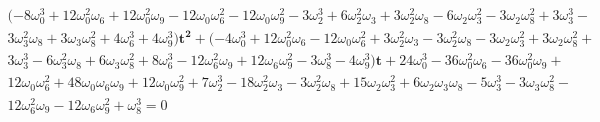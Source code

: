 \documentclass[a4paper,10pt]{amsart}
\theoremstyle{plain}
\theoremstyle{definition}
\theoremstyle{remark}
\numberwithin{equation}{section}
\begin{document}
    \begin{gather*}
(-8\omega_{0}^3 + 12\omega_{0}^2\omega_{6} + 
12\omega_{0}^2\omega_{9} - 12\omega_{0}\omega_{6}^2 - 12\omega_{0}\omega_{9}^2
    - 3\omega_{2}^3 + 6\omega_{2}^2\omega_{3} + 3\omega_{2}^2\omega_{8} - 6\omega_{2}\omega_{3}^2 - 3\omega_{2}\omega_{8}^2
    + 3\omega_{3}^3 -\\ 3\omega_{3}^2\omega_{8} + 
3\omega_{3}\omega_{8}^2 + 4\omega_{6}^3 + 4\omega_{9}^3)\pmb{t^2} + (-
    4\omega_{0}^3 + 12\omega_{0}^2\omega_{6} - 12\omega_{0}\omega_{6}^2 + 3\omega_{2}^2\omega_{3} - 3\omega_{2}^2\omega_{8} -
    3\omega_{2}\omega_{3}^2 + 3\omega_{2}\omega_{8}^2 +\\ 3\omega_{3}^3 - 6\omega_{3}^2\omega_{8} + 
6\omega_{3}\omega_{8}^2 + 8\omega_{6}^3
    - 12\omega_{6}^2\omega_{9} + 12\omega_{6}\omega_{9}^2 - 3\omega_{8}^3 - 4\omega_{9}^3)\pmb{t} + 24\omega_{0}^3 - 36\omega_{0}^2\omega_{6} -
    36\omega_{0}^2\omega_{9} +\\ 12\omega_{0}\omega_{6}^2 + 48\omega_{0}\omega_{6}\omega_{9} + 
12\omega_{0}\omega_{9}^2 + 7\omega_{2}^3 - 18\omega_{2}^2\omega_{3} -
    3\omega_{2}^2\omega_{8} + 15\omega_{2}\omega_{3}^2 + 6\omega_{2}\omega_{3}\omega_{8} - 5\omega_{3}^3 - 3\omega_{3}\omega_{8}^2 -\\ 12\omega_{6}^2\omega_{9} -
    12\omega_{6}\omega_{9}^2 + \omega_{8}^3=0
    \end{gather*}
\end{document}
